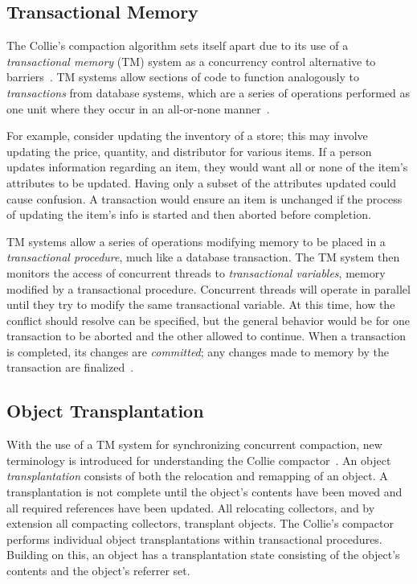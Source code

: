 \documentclass{sig-alternate}
\begin{document}
\subsection{Transactional Memory}
\label{sec:collieTM}

The Collie's compaction algorithm sets itself apart due to its use 
of a \emph{transactional memory} (TM) system as a concurrency control 
alternative to barriers~\cite{Iyengar:Collie}. TM systems allow
sections of code to function 
analogously to \emph{transactions} from database systems, 
which are a series of operations performed as one unit where 
they occur in an all-or-none manner~\cite{wiki:atomicity}.

For example, consider updating the inventory of a store; this may involve updating
the price, quantity, and distributor for various items. 
If a person updates information regarding an item, they would 
want all or none of the item's attributes to be updated. Having
only a subset of the attributes updated could cause confusion. A transaction
would ensure an item is unchanged if the process of updating the item's info 
is started and then aborted before completion.

TM systems allow a series
of operations modifying memory to be placed in
a \emph{transactional procedure}, much like a database transaction.
The TM system then monitors the access of concurrent threads to \emph{transactional variables},
memory modified by a transactional procedure.
Concurrent threads will operate in parallel until they try to modify
the same transactional variable. At this time, how 
the conflict should resolve can be specified, but the general behavior would be for one transaction
to be aborted and the other allowed to continue.
When a transaction is completed, its changes are \emph{committed}; any changes 
made to memory by the transaction are finalized~\cite{wiki:transactional-memory}.


\subsection{Object Transplantation}
\label{sec:collieTransplantation}

With the use of a TM system for synchronizing concurrent compaction,
new terminology is introduced for understanding the Collie 
compactor~\cite{Iyengar:Collie}. 
An object \emph{transplantation} consists of both the relocation and 
remapping of an object. A transplantation is not complete until
the object's contents have been moved and all required references have been
updated. All relocating collectors, and by extension all
compacting collectors, transplant objects. The Collie's compactor 
performs individual object transplantations within transactional procedures. 
Building on this, an object has a transplantation state consisting of the object's contents 
and the object's referrer set.
\end{document}

